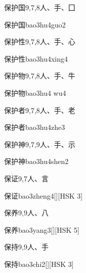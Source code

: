 \begin{entry}{保护国}{9,7,8}{⼈、⼿、⼞}
  \begin{phonetics}{保护国}{bao3hu4guo2}
  \end{phonetics}
\end{entry}

\begin{entry}{保护性}{9,7,8}{⼈、⼿、⼼}
  \begin{phonetics}{保护性}{bao3hu4xing4}
  \end{phonetics}
\end{entry}

\begin{entry}{保护物}{9,7,8}{⼈、⼿、⽜}
  \begin{phonetics}{保护物}{bao3hu4 wu4}
  \end{phonetics}
\end{entry}

\begin{entry}{保护者}{9,7,8}{⼈、⼿、⽼}
  \begin{phonetics}{保护者}{bao3hu4zhe3}
  \end{phonetics}
\end{entry}

\begin{entry}{保护神}{9,7,9}{⼈、⼿、⽰}
  \begin{phonetics}{保护神}{bao3hu4shen2}
  \end{phonetics}
\end{entry}

\begin{entry}{保证}{9,7}{⼈、⾔}
  \begin{phonetics}{保证}{bao3zheng4}[][HSK 3]
  \end{phonetics}
\end{entry}

\begin{entry}{保养}{9,9}{⼈、⼋}
  \begin{phonetics}{保养}{bao3yang3}[][HSK 5]
  \end{phonetics}
\end{entry}

\begin{entry}{保持}{9,9}{⼈、⼿}
  \begin{phonetics}{保持}{bao3chi2}[][HSK 3]
  \end{phonetics}
\end{entry}


